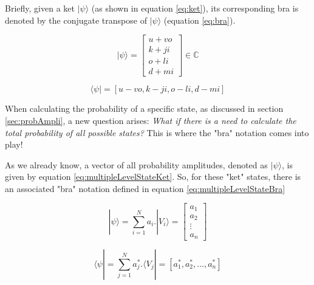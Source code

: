 			\par Briefly, given a ket $|\psi\rangle$ (as shown in equation \ref{eq:ket}), its corresponding bra is denoted by the conjugate transpose of $|\psi\rangle$ (equation \ref{eq:bra}).
			
			\begin{equation}
				\label{eq:ket}
				|\psi\rangle = 
				\begin{bmatrix}
					u + vo \\
					k + ji \\
					o + li \\
					d + mi
				\end{bmatrix} \in \mathbb{C}
			\end{equation}
		
			\begin{equation}
				\label{eq:bra}
				\langle\psi| = [u - vo, k - ji, o - li, d - mi]
			\end{equation}
		
			\par When calculating the probability of a specific state, as discussed in section \ref{sec:probAmpli}, a new question arises: \textit{What if there is a need to calculate the total probability of all possible states?} This is where the "bra" notation comes into play!\newline
			
			\par As we already know, a vector of all probability amplitudes, denoted as $|\psi\rangle$, is given by equation \ref{eq:multipleLevelStateKet}. So, for these "ket" states, there is an associated "bra" notation defined in equation \ref{eq:multipleLevelStateBra} \cite{notacaoDirac}
			
			\begin{equation}
				|\psi\rangle = \sum_{i=1}^{N} a_i . |V_i\rangle = 
				\begin{bmatrix}
					a_{1} \\
					a_{2} \\
					\vdots \\
					a_{n}
				\end{bmatrix}
				\label{eq:multipleLevelStateKet}
			\end{equation}
			
			\begin{equation}
				\langle\psi| = \sum_{j=1}^{N} a_j^* . \langle V_j| = [a_1^*, a_2^*, \dots, a_n^*]
				\label{eq:multipleLevelStateBra}
			\end{equation}				
			
